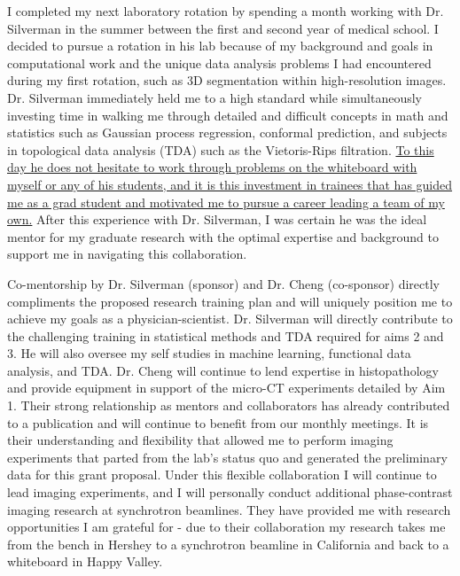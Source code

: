 \documentclass{NIHGrant}
\begin{document}
I completed my next laboratory rotation by spending a month working with Dr. Silverman in the summer between the first and second year of medical school. I decided to pursue a rotation in his lab because of my background and goals in computational work and the unique data analysis problems I had encountered during my first rotation, such as 3D segmentation within high-resolution images. Dr. Silverman immediately held me to a high standard while simultaneously investing time in walking me through detailed and difficult concepts in math and statistics such as Gaussian process regression, conformal prediction, and subjects in topological data analysis (TDA) such as the Vietoris-Rips filtration. \uline{To this day he does not hesitate to work through problems on the whiteboard with myself or any of his students, and it is this investment in trainees that has guided me as a grad student and motivated me to pursue a career leading a team of my own.} After this experience with Dr. Silverman, I was certain he was the ideal mentor for my graduate research with the optimal expertise and background to support me in navigating this collaboration.

Co-mentorship by Dr. Silverman (sponsor) and Dr. Cheng (co-sponsor) directly compliments the proposed research training plan and will uniquely position me to achieve my goals as a physician-scientist. Dr. Silverman will directly contribute to the challenging training in statistical methods and TDA required for aims 2 and 3. He will also oversee my self studies in machine learning, functional data analysis, and TDA. Dr. Cheng will continue to lend expertise in histopathology and provide equipment in support of the micro-CT experiments detailed by Aim 1. Their strong relationship as mentors and collaborators has already contributed to a publication and will continue to benefit from our monthly meetings. It is their understanding and flexibility that allowed me to perform imaging experiments that parted from the lab's status quo and generated the preliminary data for this grant proposal. Under this flexible collaboration I will continue to lead imaging experiments, and I will personally conduct additional phase-contrast imaging research at synchrotron beamlines. They have provided me with research opportunities I am grateful for - due to their collaboration my research takes me from the bench in Hershey to a synchrotron beamline in California and back to a whiteboard in Happy Valley.
\end{document}
